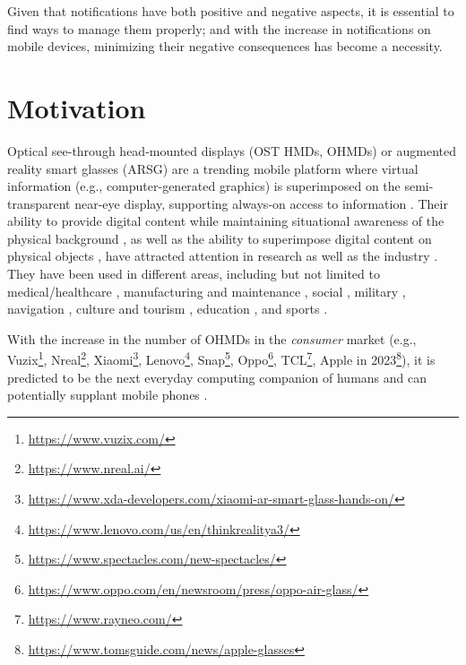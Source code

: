 Given that notifications have both positive and negative aspects, it is essential to find ways to manage them properly; and with the increase in notifications on mobile devices, minimizing their negative consequences has become a necessity.





\section{Motivation}
\label{sec:Intro:thesis_motivation}

Optical see-through head-mounted displays (OST HMDs, OHMDs) or augmented reality smart glasses (ARSG) are a trending mobile platform where virtual information (e.g., computer-generated graphics) is superimposed on the semi-transparent near-eye display, supporting always-on access to information \cite{itoh_towards_2021, azuma_survey_1997, rauschnabel_augmented_2015}. Their ability to provide digital content while maintaining situational awareness of the physical background \cite{orlosky_managing_2014, gruenefeld_guiding_2018}, as well as the ability to superimpose digital content on physical objects \cite{azuma_survey_1997}, have attracted attention in research as well as the industry \cite{rauschnabel_augmented_2015}. They have been used in different areas, including but not limited to medical/healthcare \cite{mitrasinovic_clinical_2015, chicchi_giglioli_augmented_2015}, manufacturing and maintenance \cite{wang_comprehensive_2016, peng_roma_2018}, social \cite{piumsomboon_mini_me_2018, ofek_reducing_2013, mcatamney_examination_2006}, military \cite{bach_us_2021}, navigation \cite{roy_follow_my_lead_2017, anandapadmanaban_holo_sextant_2018}, culture and tourism \cite{de_paolis_natural_2014}, education \cite{ibrahim_arbis_2018, akcayir_advantages_2017, zarraonandia_augmented_2013}, and sports \cite{fan_augmented_2016, ban_augmented_2013, piekarski_arquake_2002}.

With the increase in the number of OHMDs in the \textit{consumer} market \cite{alsop_ar_2022} (e.g., Vuzix\footnote{\url{https://www.vuzix.com/}}, Nreal\footnote{\url{https://www.nreal.ai/}}, Xiaomi\footnote{\url{https://www.xda-developers.com/xiaomi-ar-smart-glass-hands-on/}}, Lenovo\footnote{\url{https://www.lenovo.com/us/en/thinkrealitya3/}}, Snap\footnote{\url{https://www.spectacles.com/new-spectacles/}}, Oppo\footnote{\url{https://www.oppo.com/en/newsroom/press/oppo-air-glass/}}, TCL\footnote{\url{https://www.rayneo.com/}}, Apple in 2023\footnote{\url{https://www.tomsguide.com/news/apple-glasses}}), it is predicted to be the next everyday computing companion of humans and can potentially supplant mobile phones \cite{azuma_road_2019, chia_smart_2019, conditt_worlds_2018}.


